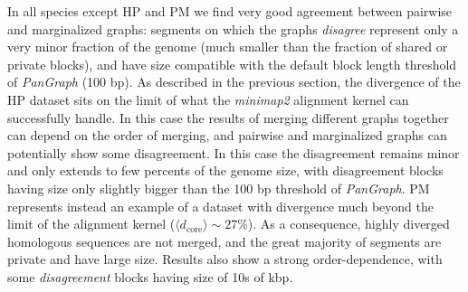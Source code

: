 \documentclass[aps,rmp,reprint,superscriptaddress,notitlepage,10pt,onecolumn]{revtex4-1}
\newcommand{\dcore}{\langle d_\text{core} \rangle}
\begin{document}
In all species except HP and PM we find very good agreement between pairwise and marginalized graphs: segments on which the graphs \textit{disagree} represent only a very minor fraction of the genome (much smaller than the fraction of shared or private blocks), and have size compatible with the default block length threshold of \textit{PanGraph} (100 bp).
As described in the previous section, the divergence of the HP dataset sits on the limit of what the \textit{minimap2} alignment kernel can successfully handle. In this case the results of merging different graphs together can depend on the order of merging, and pairwise and marginalized graphs can potentially show some disagreement. In this case the disagreement remains minor and only extends to few percents of the genome size, with disagreement blocks having size only slightly bigger than the 100 bp threshold of \textit{PanGraph}.
PM represents instead an example of a dataset with divergence much beyond the limit of the alignment kernel ($\dcore \sim 27 \%$). As a consequence, highly diverged homologous sequences are not merged, and the great majority of segments are private and have large size. Results also show a strong order-dependence, with some \textit{disagreement} blocks having size of 10s of kbp.
\end{document}
